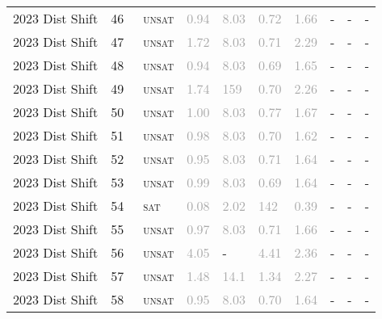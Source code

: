 \begin{center}
{\begin{longtable}{@{}llllllllll@{}}
2023 Dist Shift & 46 & ~\textsc{unsat} & \textcolor{darkgray}{0.94} & \textcolor{darkgray}{8.03} & \textcolor{darkgray}{0.72} & \textcolor{darkgray}{1.66} & - & - & - \\
2023 Dist Shift & 47 & ~\textsc{unsat} & \textcolor{darkgray}{1.72} & \textcolor{darkgray}{8.03} & \textcolor{darkgray}{0.71} & \textcolor{darkgray}{2.29} & - & - & - \\
2023 Dist Shift & 48 & ~\textsc{unsat} & \textcolor{darkgray}{0.94} & \textcolor{darkgray}{8.03} & \textcolor{darkgray}{0.69} & \textcolor{darkgray}{1.65} & - & - & - \\
2023 Dist Shift & 49 & ~\textsc{unsat} & \textcolor{darkgray}{1.74} & \textcolor{darkgray}{159} & \textcolor{darkgray}{0.70} & \textcolor{darkgray}{2.26} & - & - & - \\
2023 Dist Shift & 50 & ~\textsc{unsat} & \textcolor{darkgray}{1.00} & \textcolor{darkgray}{8.03} & \textcolor{darkgray}{0.77} & \textcolor{darkgray}{1.67} & - & - & - \\
2023 Dist Shift & 51 & ~\textsc{unsat} & \textcolor{darkgray}{0.98} & \textcolor{darkgray}{8.03} & \textcolor{darkgray}{0.70} & \textcolor{darkgray}{1.62} & - & - & - \\
2023 Dist Shift & 52 & ~\textsc{unsat} & \textcolor{darkgray}{0.95} & \textcolor{darkgray}{8.03} & \textcolor{darkgray}{0.71} & \textcolor{darkgray}{1.64} & - & - & - \\
2023 Dist Shift & 53 & ~\textsc{unsat} & \textcolor{darkgray}{0.99} & \textcolor{darkgray}{8.03} & \textcolor{darkgray}{0.69} & \textcolor{darkgray}{1.64} & - & - & - \\
2023 Dist Shift & 54 & ~\textsc{sat} & \textcolor{darkgray}{0.08} & \textcolor{darkgray}{2.02} & \textcolor{darkgray}{142} & \textcolor{darkgray}{0.39} & - & - & - \\
2023 Dist Shift & 55 & ~\textsc{unsat} & \textcolor{darkgray}{0.97} & \textcolor{darkgray}{8.03} & \textcolor{darkgray}{0.71} & \textcolor{darkgray}{1.66} & - & - & - \\
2023 Dist Shift & 56 & ~\textsc{unsat} & \textcolor{darkgray}{4.05} & - & \textcolor{darkgray}{4.41} & \textcolor{darkgray}{2.36} & - & - & - \\
2023 Dist Shift & 57 & ~\textsc{unsat} & \textcolor{darkgray}{1.48} & \textcolor{darkgray}{14.1} & \textcolor{darkgray}{1.34} & \textcolor{darkgray}{2.27} & - & - & - \\
2023 Dist Shift & 58 & ~\textsc{unsat} & \textcolor{darkgray}{0.95} & \textcolor{darkgray}{8.03} & \textcolor{darkgray}{0.70} & \textcolor{darkgray}{1.64} & - & - & - \\

\end{longtable}}
\end{center}
